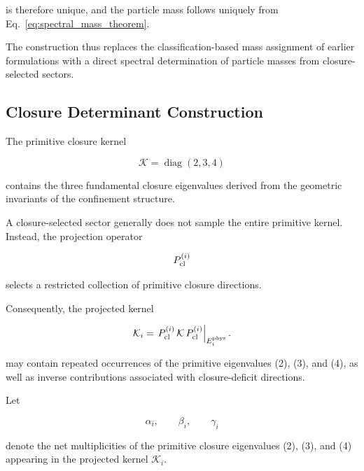 \documentclass[11pt]{article}
\theoremstyle{definition}
\theoremstyle{remark}
\begin{document}
is therefore unique, and the particle mass follows uniquely
from Eq.~\eqref{eq:spectral_mass_theorem}.

The construction thus replaces the classification-based mass
assignment of earlier formulations with a direct spectral
determination of particle masses from closure-selected sectors.



\subsection{Closure Determinant Construction}
\label{subsec:closure_determinant_construction}

The primitive closure kernel

\begin{equation}
\mathcal K =
\operatorname{diag}(2,3,4)
\end{equation}

contains the three fundamental closure eigenvalues derived from
the geometric invariants of the confinement structure.

A closure-selected sector generally does not sample the entire
primitive kernel. Instead, the projection operator

\begin{equation}
P_{\rm cl}^{(i)}
\end{equation}

selects a restricted collection of primitive closure directions.

Consequently, the projected kernel

\begin{equation}
\mathcal K_i
=
\left.
P_{\rm cl}^{(i)}
\,\mathcal K\,
P_{\rm cl}^{(i)}
\right|_{E_i^{\rm phys}} .
\label{eq:projected_kernel}
\end{equation}

may contain repeated occurrences of the primitive eigenvalues
(2), (3), and (4), as well as inverse contributions
associated with closure-deficit directions.

Let

\begin{equation}
\alpha_i,
\qquad
\beta_i,
\qquad
\gamma_i
\end{equation}

denote the net multiplicities of the primitive closure
eigenvalues (2), (3), and (4) appearing in the projected
kernel \(\mathcal K_i\).
\end{document}
